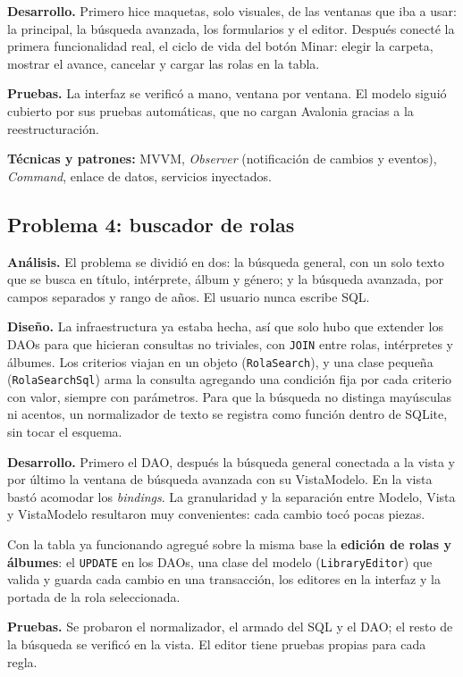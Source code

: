 \documentclass{article}
\begin{document}
\textbf{Desarrollo.} Primero hice maquetas, solo visuales, de las ventanas
que iba a usar: la principal, la búsqueda avanzada, los formularios y el
editor. Después conecté la primera funcionalidad real, el ciclo de vida del
botón Minar: elegir la carpeta, mostrar el avance, cancelar y cargar las
rolas en la tabla.

\textbf{Pruebas.} La interfaz se verificó a mano, ventana por ventana. El
modelo siguió cubierto por sus pruebas automáticas, que no cargan Avalonia
gracias a la reestructuración.

\textbf{Técnicas y patrones:} MVVM, \emph{Observer} (notificación de cambios
y eventos), \emph{Command}, enlace de datos, servicios inyectados.

\subsection{Problema 4: buscador de rolas}

\textbf{Análisis.} El problema se dividió en dos: la búsqueda general, con
un solo texto que se busca en título, intérprete, álbum y género; y la
búsqueda avanzada, por campos separados y rango de años. El usuario nunca
escribe SQL.

\textbf{Diseño.} La infraestructura ya estaba hecha, así que solo hubo que
extender los DAOs para que hicieran consultas no triviales, con
\texttt{JOIN} entre rolas, intérpretes y álbumes. Los criterios viajan en un
objeto (\texttt{RolaSearch}), y una clase pequeña (\texttt{RolaSearchSql})
arma la consulta agregando una condición fija por cada criterio con valor,
siempre con parámetros. Para que la búsqueda no distinga mayúsculas ni
acentos, un normalizador de texto se registra como función dentro de SQLite,
sin tocar el esquema.

\textbf{Desarrollo.} Primero el DAO, después la búsqueda general conectada a
la vista y por último la ventana de búsqueda avanzada con su VistaModelo. En
la vista bastó acomodar los \emph{bindings}. La granularidad y la separación
entre Modelo, Vista y VistaModelo resultaron muy convenientes: cada cambio
tocó pocas piezas.

Con la tabla ya funcionando agregué sobre la misma base la \textbf{edición
de rolas y álbumes}: el \texttt{UPDATE} en los DAOs, una clase del modelo
(\texttt{LibraryEditor}) que valida y guarda cada cambio en una transacción,
los editores en la interfaz y la portada de la rola seleccionada.

\textbf{Pruebas.} Se probaron el normalizador, el armado del SQL y el DAO;
el resto de la búsqueda se verificó en la vista. El editor tiene pruebas
propias para cada regla.
\end{document}
